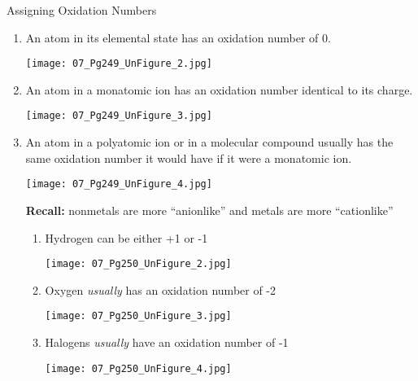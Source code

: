 \documentclass[handout]{beamer}
\begin{document}
\begin{frame}[allowframebreaks=0.9]{Assigning Oxidation Numbers}
	\begin{enumerate}
		\item An atom in its elemental state has an oxidation
			number of 0.

			\begin{center}
				\texttt{[image: 07\_Pg249\_UnFigure\_2.jpg]}
			\end{center}
		\item An atom in a monatomic ion has an oxidation
			number identical to its charge.

			\begin{center}
				\texttt{[image: 07\_Pg249\_UnFigure\_3.jpg]}
			\end{center}
		\item An atom in a polyatomic ion or in a molecular
			compound usually has the same oxidation number it would
			have if it were a monatomic ion.

			\begin{center}
				\texttt{[image: 07\_Pg249\_UnFigure\_4.jpg]}
			\end{center}

			\textbf{Recall:} nonmetals are more ``anionlike'' and
			metals are more ``cationlike''

			\framebreak

			\begin{enumerate}
				\item Hydrogen can be either +1 or -1

					\begin{center}
						\texttt{[image: 07\_Pg250\_UnFigure\_2.jpg]}
					\end{center}

				\item Oxygen \emph{usually} has an oxidation
					number of -2
				
					\begin{center}
						\texttt{[image: 07\_Pg250\_UnFigure\_3.jpg]}
					\end{center}

				\item Halogens \emph{usually} have an oxidation
					number of -1

					\begin{center}
						\texttt{[image: 07\_Pg250\_UnFigure\_4.jpg]}
					\end{center}
			\end{enumerate}


\end{enumerate}
\end{frame}
\end{document}
